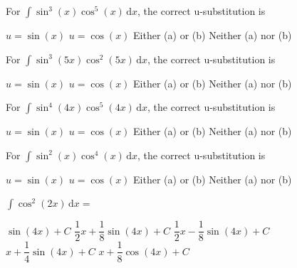 \begin{questions}
    \question For $\int \sin^3 (x)\cos^5 (x) \,\mathrm{d}x$, the correct u-substitution is \\

    \begin{oneparchoices}
        \choice $u = \sin (x)$ 
        \choice $u = \cos (x)$
        \choice Either (a) or (b)
        \choice Neither (a) nor (b)
    \end{oneparchoices} \par \horizontalline

    \question For $\int \sin^3 (5x)\cos^2 (5x) \,\mathrm{d}x$, the correct u-substitution is \\

    \begin{oneparchoices}
        \choice $u = \sin (x)$ 
        \choice $u = \cos (x)$
        \choice Either (a) or (b)
        \choice Neither (a) nor (b)
    \end{oneparchoices} \par \horizontalline

    \question For $\int \sin^4 (4x)\cos^5 (4x) \,\mathrm{d}x$, the correct u-substitution is \\

    \begin{oneparchoices}
        \choice $u = \sin (x)$ 
        \choice $u = \cos (x)$
        \choice Either (a) or (b)
        \choice Neither (a) nor (b)
    \end{oneparchoices} \par \horizontalline

    \question For $\int \sin^2 (x)\cos^4 (x) \,\mathrm{d}x$, the correct u-substitution is \\

    \begin{oneparchoices}
        \choice $u = \sin (x)$ 
        \choice $u = \cos (x)$
        \choice Either (a) or (b)
        \choice Neither (a) nor (b)
    \end{oneparchoices} \par \horizontalline

    \question $\int \cos^2 (2x) \,\mathrm{d}x = $ \\

    \begin{oneparchoices}
        \choice $\sin (4x) + C$
        \choice $\dfrac{1}{2}x + \dfrac{1}{8}\sin (4x) + C$
        \choice $\dfrac{1}{2}x - \dfrac{1}{8}\sin (4x) + C$ \\[11pt]
        \makebox[0.18\textwidth] \choice $x + \dfrac{1}{4}\sin (4x) + C$
        \makebox[0.22\textwidth] \choice $x + \dfrac{1}{8}\cos (4x) + C$
    \end{oneparchoices} \par \horizontalline


\end{questions}
